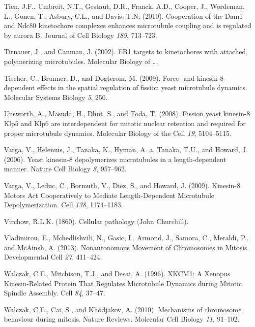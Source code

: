 \documentclass[12pt,a4paper,twoside,openright]{book}
\begin{document}
\hypertarget{ref-Tien2010}{}
Tien, J.F., Umbreit, N.T., Gestaut, D.R., Franck, A.D., Cooper, J.,
Wordeman, L., Gonen, T., Asbury, C.L., and Davis, T.N. (2010).
Cooperation of the Dam1 and Ndc80 kinetochore complexes enhances
microtubule coupling and is regulated by aurora B. Journal of Cell
Biology \emph{189}, 713--723.

\hypertarget{ref-Tirnauer2002}{}
Tirnauer, J., and Canman, J. (2002). EB1 targets to kinetochores with
attached, polymerizing microtubules. Molecular Biology of \ldots{}.

\hypertarget{ref-Tischer2009}{}
Tischer, C., Brunner, D., and Dogterom, M. (2009). Force- and
kinesin-8-dependent effects in the spatial regulation of fission yeast
microtubule dynamics. Molecular Systems Biology \emph{5}, 250.

\hypertarget{ref-Unsworth2008}{}
Unsworth, A., Masuda, H., Dhut, S., and Toda, T. (2008). Fission yeast
kinesin-8 Klp5 and Klp6 are interdependent for mitotic nuclear retention
and required for proper microtubule dynamics. Molecular Biology of the
Cell \emph{19}, 5104--5115.

\hypertarget{ref-Varga2006}{}
Varga, V., Helenius, J., Tanaka, K., Hyman, A. a, Tanaka, T.U., and
Howard, J. (2006). Yeast kinesin-8 depolymerizes microtubules in a
length-dependent manner. Nature Cell Biology \emph{8}, 957--962.

\hypertarget{ref-Varga2009}{}
Varga, V., Leduc, C., Bormuth, V., Diez, S., and Howard, J. (2009).
Kinesin-8 Motors Act Cooperatively to Mediate Length-Dependent
Microtubule Depolymerization. Cell \emph{138}, 1174--1183.

\hypertarget{ref-virchow1860cellular}{}
Virchow, R.L.K. (1860). Cellular pathology (John Churchill).

\hypertarget{ref-Vladimirou2013}{}
Vladimirou, E., Mchedlishvili, N., Gasic, I., Armond, J., Samora, C.,
Meraldi, P., and McAinsh, A. (2013). Nonautonomous Movement of
Chromosomes in Mitosis. Developmental Cell \emph{27}, 411--424.

\hypertarget{ref-Walczak1996}{}
Walczak, C.E., Mitchison, T.J., and Desai, A. (1996). XKCM1: A Xenopus
Kinesin-Related Protein That Regulates Microtubule Dynamics during
Mitotic Spindle Assembly. Cell \emph{84}, 37--47.

\hypertarget{ref-Walczak2010}{}
Walczak, C.E., Cai, S., and Khodjakov, A. (2010). Mechanisms of
chromosome behaviour during mitosis. Nature Reviews. Molecular Cell
Biology \emph{11}, 91--102.
\end{document}
